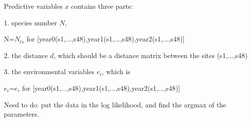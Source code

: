 \documentclass[10pt]{article}
\begin{document}
Predictive variables $x$ contains three parts: 

1. species number $N$, 

\begin{center}
N=$N_{ts}$ for [year0(s1,...,s48),year1(s1,...,s48),year2(s1,...,s48)]
\end{center}

2. the distance $d$, which should be a distance matrix between the sites (s1,...,s48)

3. the environmental variables $e_i$, which is

\begin{center}
$e_i$=$e_{i}$ for [year0(s1,...,s48),year1(s1,...,s48),year2(s1,...,s48)]
\end{center}

Need to do: put the data in the log likelihood, and find the argmax of the parameters. 
\end{document}
